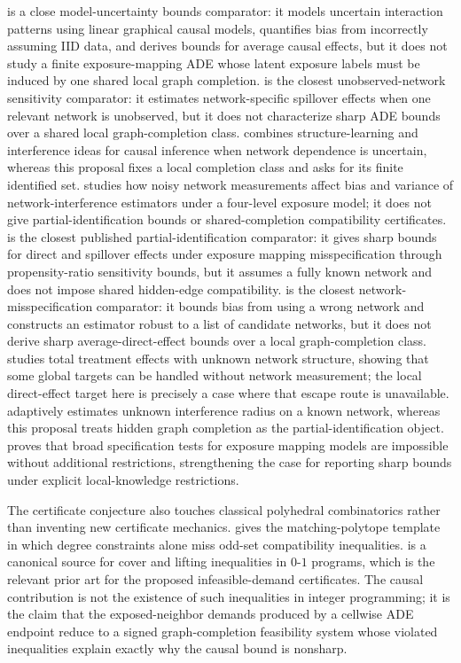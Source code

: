 \documentclass[11pt]{article}
\theoremstyle{definition}
\theoremstyle{plain}
\theoremstyle{remark}
\begin{document}
\citet{ZhangMohanPearl2023} is a close model-uncertainty bounds comparator: it models uncertain interaction patterns using linear graphical causal models, quantifies bias from incorrectly assuming IID data, and derives bounds for average causal effects, but it does not study a finite exposure-mapping ADE whose latent exposure labels must be induced by one shared local graph completion.  \citet{Egami2020} is the closest unobserved-network sensitivity comparator: it estimates network-specific spillover effects when one relevant network is unobserved, but it does not characterize sharp ADE bounds over a shared local graph-completion class.  \citet{BhattacharyaMalinskyShpitser2020} combines structure-learning and interference ideas for causal inference when network dependence is uncertain, whereas this proposal fixes a local completion class and asks for its finite identified set.  \citet{LiSussmanKolaczyk2021} studies how noisy network measurements affect bias and variance of network-interference estimators under a four-level exposure model; it does not give partial-identification bounds or shared-completion compatibility certificates.  \citet{SchroderOprescuFeuerriegelKallus2026} is the closest published partial-identification comparator: it gives sharp bounds for direct and spillover effects under exposure mapping misspecification through propensity-ratio sensitivity bounds, but it assumes a fully known network and does not impose shared hidden-edge compatibility.  \citet{WeinsteinNevo2026} is the closest network-misspecification comparator: it bounds bias from using a wrong network and constructs an estimator robust to a list of candidate networks, but it does not derive sharp average-direct-effect bounds over a local graph-completion class.  \citet{YuAiroldiBorgsChayes2022} studies total treatment effects with unknown network structure, showing that some global targets can be handled without network measurement; the local direct-effect target here is precisely a case where that escape route is unavailable.  \citet{BelloniFangVolfovsky2022} adaptively estimates unknown interference radius on a known network, whereas this proposal treats hidden graph completion as the partial-identification object.  \citet{GaoHarshawSavjeWang2026} proves that broad specification tests for exposure mapping models are impossible without additional restrictions, strengthening the case for reporting sharp bounds under explicit local-knowledge restrictions.

The certificate conjecture also touches classical polyhedral combinatorics rather than inventing new certificate mechanics.  \citet{Edmonds1965} gives the matching-polytope template in which degree constraints alone miss odd-set compatibility inequalities.  \citet{Wolsey1975} is a canonical source for cover and lifting inequalities in \(0\)-\(1\) programs, which is the relevant prior art for the proposed infeasible-demand certificates.  The causal contribution is not the existence of such inequalities in integer programming; it is the claim that the exposed-neighbor demands produced by a cellwise ADE endpoint reduce to a signed graph-completion feasibility system whose violated inequalities explain exactly why the causal bound is nonsharp.
\end{document}
